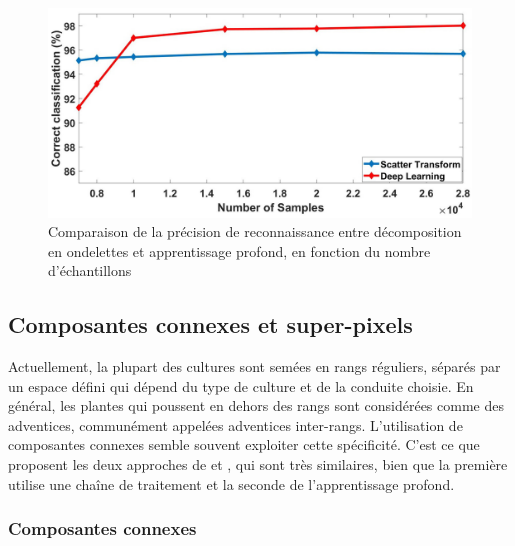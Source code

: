 \documentclass[../thesis.tex]{subfiles}
\begin{document}
    \begin{figure}[H]
        \centering
        \includegraphics[width=0.7\linewidth]{img/biblio/difference-rasti-2}
        \caption{Comparaison de la précision de reconnaissance entre décomposition en ondelettes et apprentissage profond, en fonction du nombre d'échantillons}
        \label{fig:difference-rasti-2}
    \end{figure}
    
    
    \newpage
    \subsection{Composantes connexes et super-pixels} %
    
    Actuellement, la plupart des cultures sont semées en rangs réguliers, séparés par un espace défini qui dépend du type de culture et de la conduite choisie. En général, les plantes qui poussent en dehors des rangs sont considérées comme des adventices, communément appelées adventices inter-rangs. L'utilisation de composantes connexes semble souvent exploiter cette spécificité. C'est ce que proposent les deux approches de \cite{rs10050761} et \cite{rs10111690}, qui sont très similaires, bien que la première utilise une chaîne de traitement et la seconde de l'apprentissage profond.
    
    \subsubsection{Composantes connexes} %
    
\end{document}

